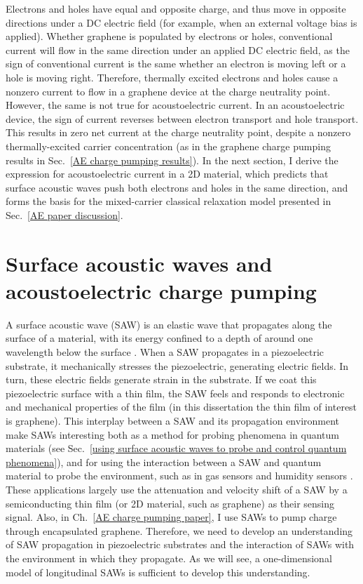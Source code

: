 \documentclass{beavtex_dub_edit}
\begin{document}
Electrons and holes have equal and opposite charge, and thus move in opposite directions under a DC electric field (for example, when an external voltage bias is applied). Whether graphene is populated by electrons or holes, conventional current will flow in the same direction under an applied DC electric field, as the sign of conventional current is the same whether an electron is moving left or a hole is moving right. Therefore, thermally excited electrons and holes cause a nonzero current to flow in a graphene device at the charge neutrality point. However, the same is not true for acoustoelectric current. In an acoustoelectric device, the sign of current reverses between electron transport and hole transport. This results in zero net current at the charge neutrality point, despite a nonzero thermally-excited carrier concentration (as in the graphene charge pumping results in Sec.\ \ref{AE charge pumping results}). In the next section, I derive the expression for acoustoelectric current in a 2D material, which predicts that surface acoustic waves push both electrons and holes in the same direction, and forms the basis for the mixed-carrier classical relaxation model presented in Sec.\ \ref{AE paper discussion}.

\section{Surface acoustic waves and acoustoelectric charge pumping}

A surface acoustic wave (SAW) is an elastic wave that propagates along the surface of a material, with its energy confined to a depth of around one wavelength below the surface \cite{rayleigh_waves_1885}. When a SAW propagates in a piezoelectric substrate, it mechanically stresses the piezoelectric, generating electric fields. In turn, these electric fields generate strain in the substrate. If we coat this piezoelectric surface with a thin film, the SAW feels and responds to electronic and mechanical properties of the film (in this dissertation the thin film of interest is graphene). This interplay between a SAW and its propagation environment make SAWs interesting both as a method for probing phenomena in quantum materials (see Sec.\ \ref{using surface acoustic waves to probe and control quantum phenomena}), and for using the interaction between a SAW and quantum material to probe the environment, such as in gas sensors and humidity sensors \cite{yang_gas_2017}. These applications largely use the attenuation and velocity shift of a SAW by a semiconducting thin film (or 2D material, such as graphene) as their sensing signal. Also, in Ch.\ \ref{AE charge pumping paper}, I use SAWs to pump charge through encapsulated graphene. Therefore, we need to develop an understanding of SAW propagation in piezoelectric substrates and the interaction of SAWs with the environment in which they propagate. As we will see, a one-dimensional model of longitudinal SAWs is sufficient to develop this understanding. 
\end{document}
